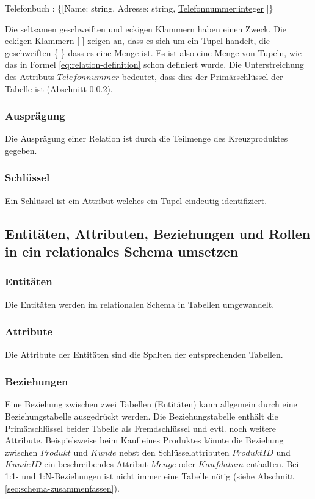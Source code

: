 \begin{center}
Telefonbuch : \{[Name: string, Adresse: string, \underline{Telefonnummer:integer} ]\}
\end{center}

Die seltsamen geschweiften und eckigen Klammern haben einen Zweck. Die eckigen Klammern [ ] zeigen an, dass es sich um ein Tupel handelt, die geschweiften \{ \} dass es eine Menge ist. Es ist also eine Menge von Tupeln, wie das in Formel \ref{eq:relation-definition} schon definiert wurde. Die Unterstreichung des Attributs \(Telefonnummer\) bedeutet, dass dies der Primärschlüssel der Tabelle ist (Abschnitt \ref{sec:primary-key-def}).

\subsubsection{Ausprägung}
Die Ausprägung einer Relation ist durch die Teilmenge des Kreuzproduktes gegeben.

\subsubsection{Schlüssel}
\label{sec:primary-key-def}
Ein Schlüssel ist ein Attribut welches ein Tupel eindeutig identifiziert.

\subsection{Entitäten, Attributen, Beziehungen und Rollen in ein relationales Schema umsetzen}

\subsubsection{Entitäten}
Die Entitäten werden im relationalen Schema in Tabellen umgewandelt. 

\subsubsection{Attribute}
Die Attribute der Entitäten sind die Spalten der entsprechenden Tabellen.

\subsubsection{Beziehungen}
Eine Beziehung zwischen zwei Tabellen (Entitäten) kann allgemein durch eine Beziehungstabelle ausgedrückt werden. Die Beziehungstabelle enthält die Primärschlüssel beider Tabelle als Fremdschlüssel und evtl. noch weitere Attribute. Beispielsweise beim Kauf eines Produktes könnte die Beziehung zwischen \(Produkt\) und \(Kunde\) nebst den Schlüsselattributen \(ProduktID\) und \(KundeID\) ein beschreibendes Attribut \(Menge\) oder \(Kaufdatum\) enthalten. Bei 1:1- und 1:N-Beziehungen ist nicht immer eine Tabelle nötig (siehe Abschnitt \ref{sec:schema-zusammenfassen}).

